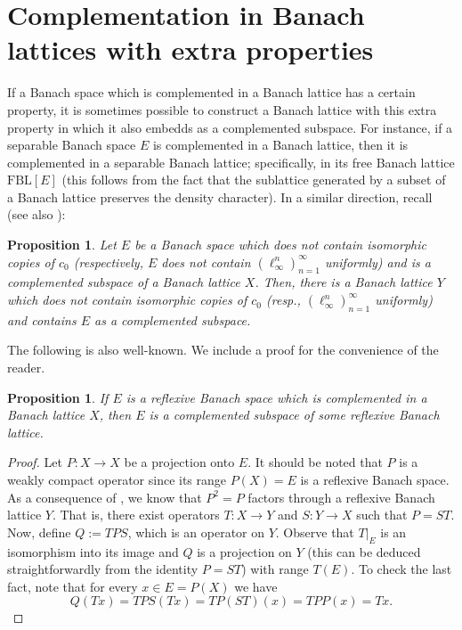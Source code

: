 \documentclass[11pt]{amsart}
\newtheorem{prop}[thm]{Proposition}
\theoremstyle{definition}
\numberwithin{equation}{section}
\newcommand{\fbl}{\text{FBL}}
\begin{document}
\section{Complementation in Banach lattices with extra properties}\label{sec:extra properties}



If a Banach space which is complemented in a Banach lattice has a certain property, it is sometimes possible to construct a Banach lattice with this extra property in which it also embedds as a complemented subspace. For instance, if a separable Banach space $E$ is complemented in a Banach lattice, then it is complemented in a separable Banach lattice; specifically, in its free Banach lattice $\fbl[E]$ (this follows from the fact that the sublattice generated by a subset of a Banach lattice preserves the density character). In a similar direction, recall  \cite[Proposition 1.c.6]{LT2-book} (see also \cite[Proposition 2.6 (i)]{FJT75}):

\begin{prop}\label{prop:not-containing-c0}
    Let $E$ be a Banach space which does not contain isomorphic copies of $c_0$ (respectively, $E$ does not contain $(\ell_\infty^n)_{n=1}^\infty$ uniformly) and is a complemented subspace of a Banach lattice $X$. Then, there is a Banach lattice $Y$ which does not contain isomorphic copies of $c_0$ (resp., $(\ell_\infty^n)_{n=1}^\infty$ uniformly) and contains $E$ as a complemented subspace.
\end{prop}


The following is also well-known. We include a proof for the convenience of the reader.

\begin{prop}\label{prop:complemented-reflexive}
    If $E$ is a reflexive Banach space which is complemented in a Banach lattice $X$, then $E$ is a complemented subspace of some reflexive Banach lattice.
\end{prop}
\begin{proof}
Let $P:X\to X$ be a projection onto $E$. It should be noted that $P$ is a weakly compact operator since its range $P(X)=E$ is a reflexive Banach space. As a consequence of \cite[Corollary 2.7]{AB84}, we know that $P^2=P$ factors through a reflexive Banach lattice $Y$. That is, there exist operators $T:X\to Y$ and $S:Y\to X$ such that $P=ST$. Now, define $Q:=TPS$, which is an operator on $Y$. Observe that $\left.T\right|_E$ is an isomorphism into its image and $Q$ is a projection on $Y$ (this can be deduced straightforwardly from the identity $P=ST$) with range $T(E)$. To check the last fact, note that for every $x\in E=P(X)$ we have
$$
Q(Tx)=TPS(Tx)=TP(ST)(x)=TPP(x)=Tx.
$$
\end{proof}
\end{document}
